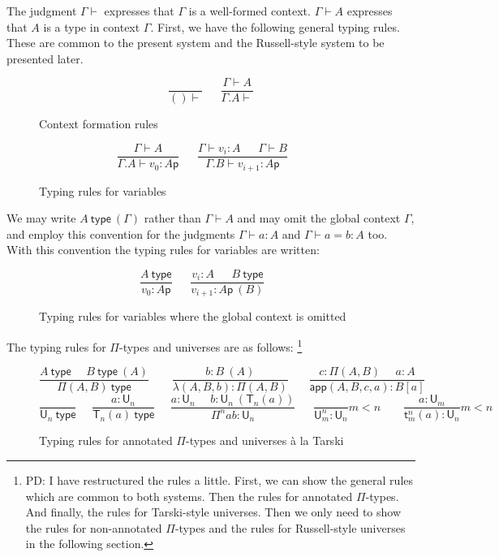 \documentclass[11pt,a4paper]{article}
\theoremstyle{definition}
\def\UU{\mathsf{U}}
\newcommand{\type}{\mathsf{type}}
\newcommand{\LAM}{\lambda}
\newcommand{\APP}{\mathsf{app}}
\newcommand{\T}{\mathsf{T}}
\newcommand{\sT}{\mathsf{t}}
\newcommand{\pp}{\mathsf{p}}
\begin{document}
\medskip

The judgment $\Gamma\vdash$ expresses that $\Gamma$ is a well-formed context. $\Gamma\vdash A$ expresses that $A$ is a type in context $\Gamma$. First, we have the following general typing rules. These are common to the present system and the Russell-style system to be presented later.
\begin{figure}[H]
  \caption{Context formation rules} 
  $$
\frac{}{()\vdash}~~~~~~~\frac{\Gamma\vdash A}{\Gamma.A\vdash}
$$
\end{figure}
\begin{figure}[H]
  \caption{Typing rules for variables} 
  $$
\frac{\Gamma\vdash A}{\Gamma.A\vdash v_0:A\pp}~~~~~~~
\frac{\Gamma\vdash v_i:A~~~~~~~\Gamma\vdash B}{\Gamma.B\vdash v_{i+1}:A\pp}~~~~~~~
$$
\end{figure}
We may write $A~\type~(\Gamma)$ rather than $\Gamma\vdash A$ and may omit the global context $\Gamma$, and employ this convention for the judgments $\Gamma \vdash a : A$ and $\Gamma \vdash a = b : A$ too. With this convention the typing rules for variables are written:
\begin{figure}[h]
\caption{Typing rules for variables where the global context is omitted}
$$
\frac{A~\type}{v_0:A\pp}~~~~~~~
\frac{v_i:A~~~~~~~B~\type}{v_{i+1}:A\pp\ (B)}~~~~~~~
$$
\end{figure}

The typing rules for $\Pi$-types and universes are as follows:
\footnote{PD: I have restructured the rules a little. First, we can show the general rules which are common to both systems. Then the rules for annotated $\Pi$-types. And finally, the rules for Tarski-style universes. Then we only need to show the rules for non-annotated $\Pi$-types and the rules for Russell-style universes in the following section.}
\begin{figure}[H]
  \caption{Typing rules for annotated $\Pi$-types and universes \`a la Tarski}\label{type-Tarski}
$$
    \frac{A~\type~~~~~~B~\type~(A)}{\Pi(A,B)~\type}
 ~~~~~~~~~
\frac{b:B~(A)}{\LAM(A,B,b):\Pi(A,B)}
~~~~~~~~
\frac{c:\Pi(A,B)~~~~~~a:A}
     {\APP(A,B,c,a):B[a]}
$$
$$
\frac{}{\UU_n~\type}~~~~~~
\frac{a:\UU_{n}}{\T_{n}(a)~\type}~~~~~~
\frac{a:\UU_{n}~~~~~~b:\UU_n~(\T_{n}(a))}
     {\Pi^{n} a b:\UU_{n}}
        ~~~~~~~
\frac{}{\UU^{n}_m:\UU_{n}}m<n
~~~~~~~~~\frac{a:\UU_{m}}{\sT_{m}^{n}(a):\UU_{n}}m<n
$$
\end{figure}
\end{document}
